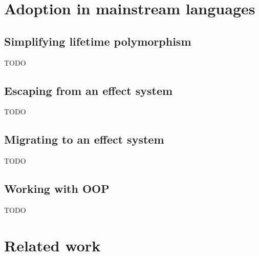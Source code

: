 \documentclass[acmsmall]{acmart}
\begin{document}



\section{Adoption in mainstream languages} \label{sec:mainstream}


\subsection{Simplifying lifetime polymorphism} \label{subsec:lifetime-elision}


TODO %

\subsection{Escaping from an effect system}


TODO %

\subsection{Migrating to an effect system}

TODO %

\subsection{Working with OOP}

TODO %


\section{Related work} \label{sec:related}

\end{document}
